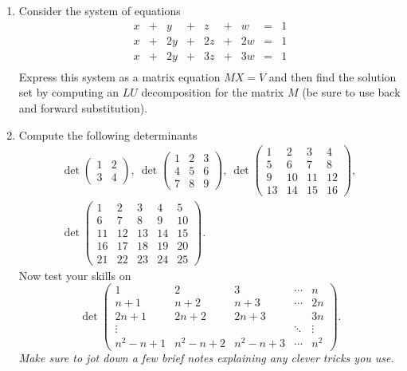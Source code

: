 \begin{enumerate}
\item Consider the system of equations
\[
\begin{array}{ccccccccc}
x&+&y&+&z&+&w&=&1\\
x&+&2y&+&2z&+&2w&=&1\\
x&+&2y&+&3z&+&3w&=&1\\
\end{array}
\]
Express this system as a matrix equation $MX=V$ and then find the solution set by computing an $LU$ 
decomposition for the matrix $M$ (be sure to use back and forward substitution).

\item
Compute the following determinants
\begin{gather*}
\det\begin{pmatrix}1&2\\3&4
\end{pmatrix},\:
\det\begin{pmatrix}1&2&3\\4&5&6\\7&8&9
\end{pmatrix},\:
\det\begin{pmatrix}1&2&3&4\\5&6&7&8\\9&10&11&12\\13&14&15&16
\end{pmatrix} ,\:\\
\det\begin{pmatrix}1&2&3&4&5\\6&7&8&9&10\\11&12&13&14&15\\
16&17&18&19&20\\21&22&23&24&25
\end{pmatrix}.
\end{gather*}
Now test your skills on
\[
\det\left(\begin{array}{ccccc}1&2&3&\cdots&n\\n+1&n+2&n+3&\cdots&2n\\2n+1&2n+2&2n+3&&3n \\
\vdots&&&\ddots&\vdots\\n^2-n+1&n^2-n+2&n^2-n+3&\cdots&n^2
\end{array}\right).
\]
{\itshape Make sure to jot down a few brief notes explaining any clever tricks you use.}


\end{enumerate}
